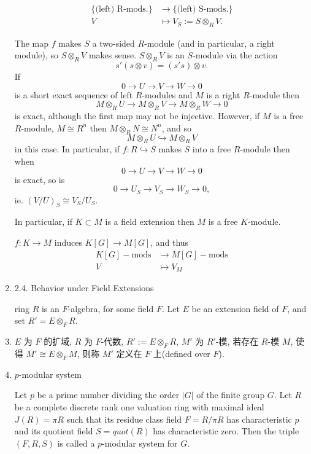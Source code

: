\documentclass[UTF8]{ctexart}
\begin{document}
\begin{enumerate}
\begin{align*}
\{\text{(left) R-mods.}\} &\to \{\text{(left) S-mods.}\}\\
V &\mapsto V_S := S \otimes_R V.
\end{align*}

The map $f$ makes $S$ a two-sided $R$-module (and in particular, a right module), so $S \otimes_R V$ makes sense. $S \otimes_R V$ is an $S$-module via the action
\[
s'(s \otimes v) = (s's)\otimes v.
\]
If
\[
0 \to U \to V \to W \to 0
\]
is a short exact sequence of left $R$-modules and $M$ is a right $R$-module then
\[
M\otimes_R U \to M\otimes_R V \to M\otimes_R W \to 0
\]
is exact, although the first map may not be injective. However, if $M$ is a free $R$-module, $M \cong R^n$ then $M\otimes_R N \cong N^n$, and so
\[
M\otimes_R U \hookrightarrow M\otimes_R V
\]
in this case.
\qquad In particular, if $f : R \hookrightarrow S$ makes $S$ into a free $R$-module then when
\[
0 \to U \to V \to W \to 0
\]
is exact, so is
\[
0\to U_S\to V_S\to W_S\to  0,
\]
ie. $(V/U)_S \cong V_S/U_S$.

\qquad In particular, if $K \subset M$ is a field extension then $M$ is a free $K$-module.

\qquad $f : K \to M$ induces $K[G]\to M[G]$, and thus
\begin{align*}
K[G]\!\!-\!\!\mathrm{mods} &\to M[G]\!\!-\!\!\mathrm{mods}\\
V &\mapsto V_M
\end{align*}

\item 2.4. Behavior under Field Extensions\cite{weintraub2003representation}

ring $R$ is an $F$-algebra, for some field $F$. Let $E$ be an extension field of $F$, and set $R' = E\otimes_F R$.

\noindent\makebox[\linewidth]{\rule{\paperwidth}{0.4pt}}

\item $E$ 为 $F$ 的扩域, $R$ 为 $F$-代数, $R':=E\otimes_{F} R$, $M'$ 为 $R'$-模, 若存在 $R$-模 $M$, 使得 $M' \cong E\otimes_{F} M$, 则称 $M'$ 定义在 $F$ 上(defined over $F$).

\item $p$-modular system

Let $p$ be a prime number dividing the order $\left|G\right|$ of the finite group $G$. Let $R$ be a complete discrete rank one valuation ring with maximal ideal $J(R)=\pi R$ such that its residue class field $F = R/\pi R$ has characteristic $p$ and its quotient field $S = quot(R)$ has characteristic zero. Then the triple $(F,R,S)$ is called a $p$-modular system for $G$.


\end{enumerate}
\end{document}
